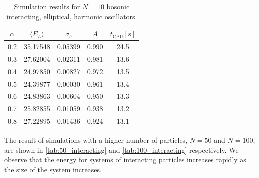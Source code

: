 \documentclass[
    a4paper, aps, twocolumn, floatfix, superscriptaddress,
    nofootinbib]{revtex4-1}
\newcommand{\1}{\mathds{1}}
\begin{document}
        \begin{table}
            \caption{Simulation results for $N = 10$ bosonic interacting,
            elliptical, harmonic oscillators.}
            \centering
            \begin{ruledtabular}
                \begin{tabular}{ccccc}
                    $\alpha$ & $\langle  E_L\rangle$ & $\sigma_b$
                    &$A$ & $t_{\text{CPU}} [\si{\second}]$ \\
                    \hline
                    0.2&35.17548&0.05399&0.990%
                    &24.5\\%
                    0.3&27.62004&0.02311&0.981%
                    &13.6\\%
                    0.4&24.97850&0.00827&0.972%
                    &13.5\\%
                    0.5&24.39877&0.00030&0.961%
                    &13.4\\%
                    0.6&24.83863&0.00604&0.950%
                    &13.3\\%
                    0.7&25.82855&0.01059&0.938%
                    &13.2\\%
                    0.8&27.22895&0.01436&0.924%
                    &13.1\\%
                \end{tabular}
            \end{ruledtabular}
            \label{tab:10_interacting}
        \end{table}

        The result of simulations with a higher number of particles, $N=50$ and
        $N=100$, are  shown in \autoref{tab:50_interacting} and
        \autoref{tab:100_interacting} respectively. We observe that the energy
        for systems of interacting particles increases rapidly as the size of
        the system increases.
\end{document}

